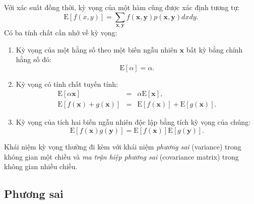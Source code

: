 \documentclass[14pt,oneside,a4paper]{report}
\numberwithin{equation}{section}
\begin{document}
Với xác suất đồng thời, kỳ vọng của một hàm cũng được xác định tương tự:
\begin{equation}
\label{eqn:30_24}
\text{E}[f(x, y)] = \sum_{\mathbf{x,y}} f(\mathbf{x, y}) p(\mathbf{x, y}) dx dy.
\end{equation}
Có ba tính chất cần nhớ về kỳ vọng:
\begin{enumerate}
\item Kỳ vọng của một hằng số theo một biến ngẫu nhiên $\mathbf{x}$ bất kỳ bằng chính hằng số đó:
\begin{equation}
	\label{eqn:30_25}
	\text{E}[\alpha] = \alpha.
\end{equation}
\item Kỳ vọng có tính chất tuyến tính:
\begin{eqnarray}
	\label{eqn:30_26}
	\text{E}[\alpha \mathbf{x}] & = & \alpha \text{E}[\mathbf{x}],  \\
	\label{eqn:30_27}
	\text{E}[f(\mathbf{x}) + g(\mathbf{x})] & = & \text{E}[f(\mathbf{x})] + \text{E}[g(\mathbf{x})].
\end{eqnarray}
\item Kỳ vọng của tích hai biến ngẫu nhiên độc lập bằng tích kỳ vọng của chúng:
\begin{equation}
	\label{eqn:30_28}
	\text{E}[f(\mathbf{x}) g(\mathbf{y})] = \text{E}[f(\mathbf{x})] \text{E}[g(\mathbf{y})].
\end{equation}

\end{enumerate}



Khái niệm kỳ vọng thường đi kèm với khái niệm \textit{phương
sai} (variance) trong không gian một chiều và \textit{ma trận hiệp
phương sai} (covariance matrix) trong không gian nhiều chiều. 

\subsection{Phương sai} %
\end{document}
